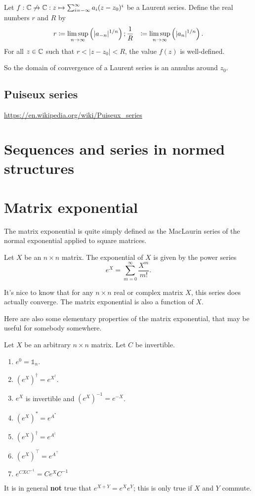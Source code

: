 \begin{proposition} \label{LaurentSeriesConvergence}
Let $f: \mathbb{C}\not\to \mathbb{C}: z\mapsto \sum_{i=-\infty}^\infty a_i(z-z_0)^i$ be a Laurent series. Define the real numbers $r$ and $R$ by
\begin{align*}
r &\coloneqq \limsup_{n\to\infty}\left(|a_{-n}|^{1/n}\right);
\frac{1}{R} &\coloneqq \limsup_{n\to\infty}\left(|a_n|^{1/n}\right).
\end{align*}
For all $z\in \mathbb{C}$ such that $r < |z-z_0| < R$, the value $f(z)$ is well-defined.
\end{proposition}
So the domain of convergence of a Laurent series is an annulus around $z_0$.

\subsection{Puiseux series}
\url{https://en.wikipedia.org/wiki/Puiseux_series}

\section{Sequences and series in normed structures}

\section{Matrix exponential}
The matrix exponential is quite simply defined as the MacLaurin series of the normal exponential applied to square matrices.

\begin{definition}
Let $X$ be an $n\times n$ matrix. The exponential of $X$ is given by the power series
\[ e^X = \sum^\infty_{m=0} \frac{X^m}{m!}. \]
\end{definition}

It's nice to know that for any $n \times n$ real or complex matrix $X$, this series does actually converge. The matrix exponential is also a  function of $X$.

Here are also some elementary properties of the matrix exponential, that may be useful for somebody somewhere.
\begin{eigenschap}
Let $X$ be an arbitrary $n\times n$ matrix. Let $C$ be invertible.
\begin{enumerate}
\item $e^0 = \mathbb{1}_n$.
\item $\left(e^X\right)^\dagger = e^{X^\dagger}$.
\item $e^X$ is invertible and $\left(e^X\right)^{-1} = e^{-X}$.
\item $\left(e^X\right)^* = e^{A^*}$
\item $\left(e^X\right)^\dagger = e^{A^\dagger}$
\item $\left(e^X\right)^\intercal = e^{A^\intercal}$
\item $e^{CXC^{-1}} = Ce^XC^{-1}$
\end{enumerate}
\end{eigenschap}
It is in general \textbf{not} true that $e^{X+Y} = e^Xe^Y$; this is only true if $X$ and $Y$ commute.

